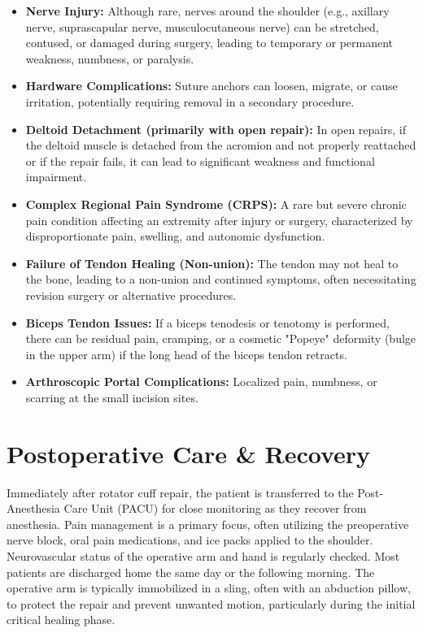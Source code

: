 \begin{itemize}
\begin{itemize}
      \item \textbf{Nerve Injury:} Although rare, nerves around the shoulder (e.g., axillary nerve, suprascapular nerve, musculocutaneous nerve) can be stretched, contused, or damaged during surgery, leading to temporary or permanent weakness, numbness, or paralysis.
      \item \textbf{Hardware Complications:} Suture anchors can loosen, migrate, or cause irritation, potentially requiring removal in a secondary procedure.
      \item \textbf{Deltoid Detachment (primarily with open repair):} In open repairs, if the deltoid muscle is detached from the acromion and not properly reattached or if the repair fails, it can lead to significant weakness and functional impairment.
      \item \textbf{Complex Regional Pain Syndrome (CRPS):} A rare but severe chronic pain condition affecting an extremity after injury or surgery, characterized by disproportionate pain, swelling, and autonomic dysfunction.
      \item \textbf{Failure of Tendon Healing (Non-union):} The tendon may not heal to the bone, leading to a non-union and continued symptoms, often necessitating revision surgery or alternative procedures.
      \item \textbf{Biceps Tendon Issues:} If a biceps tenodesis or tenotomy is performed, there can be residual pain, cramping, or a cosmetic "Popeye" deformity (bulge in the upper arm) if the long head of the biceps tendon retracts.
      \item \textbf{Arthroscopic Portal Complications:} Localized pain, numbness, or scarring at the small incision sites.
    \end{itemize}
\end{itemize}

\section*{Postoperative Care \& Recovery}
Immediately after rotator cuff repair, the patient is transferred to the Post-Anesthesia Care Unit (PACU) for close monitoring as they recover from anesthesia. Pain management is a primary focus, often utilizing the preoperative nerve block, oral pain medications, and ice packs applied to the shoulder. Neurovascular status of the operative arm and hand is regularly checked. Most patients are discharged home the same day or the following morning. The operative arm is typically immobilized in a sling, often with an abduction pillow, to protect the repair and prevent unwanted motion, particularly during the initial critical healing phase.

